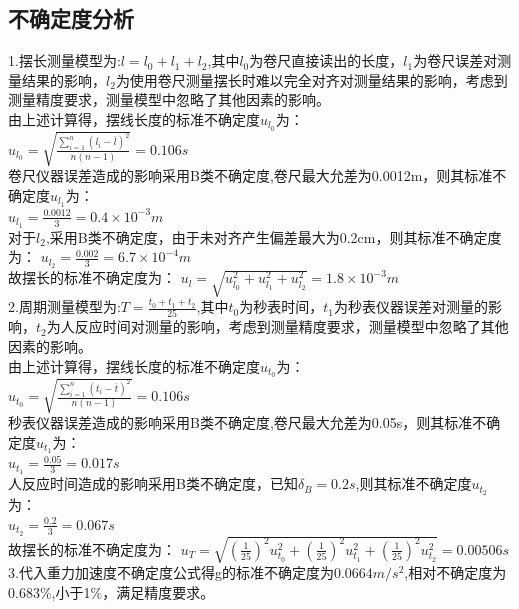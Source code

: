 \documentclass[12pt,a4paper]{article}
\begin{document}
	\subsection{不确定度分析}
	1.摆长测量模型为:$l=l_{0}+l_{1}+l_{2}$,其中$l_{0}$为卷尺直接读出的长度，$l_{1}$为卷尺误差对测量结果的影响，$l_{2}$为使用卷尺测量摆长时难以完全对齐对测量结果的影响，考虑到测量精度要求，测量模型中忽略了其他因素的影响。\\
	由上述计算得，摆线长度的标准不确定度$u_{l_{0}}$为：\\
	$u_{l_{0}}=\sqrt{\frac{\sum_{i=1}^{n} (l_{i}-\overline{l})^2}{n(n-1)}}=0.106s$\\
	卷尺仪器误差造成的影响采用B类不确定度,卷尺最大允差为0.0012m，则其标准不确定度$u_{l_{1}}$为：\\
	$u_{l_{1}}=\frac{0.0012}{3}=0.4\times10^{-3}m$\\
	对于$l_{2}$,采用B类不确定度，由于未对齐产生偏差最大为0.2cm，则其标准不确定度为：
	$u_{l_{2}}=\frac{0.002}{3}=6.7\times10^{-4}m$\\
	故摆长的标准不确定度为：
	$u_{l}=\sqrt{u_{l_{0}}^2+u_{l_{1}}^2+u_{l_{2}}^2}=1.8\times10^{-3}m$\\
	\hspace*{2em}
	2.周期测量模型为:$T=\frac{t_{0}+t_{1}+t_{2}}{25}$,其中$t_{0}$为秒表时间，$t_{1}$为秒表仪器误差对测量的影响，$t_{2}$为人反应时间对测量的影响，考虑到测量精度要求，测量模型中忽略了其他因素的影响。\\
	由上述计算得，摆线长度的标准不确定度$u_{t_{0}}$为：\\
	$u_{t_{0}}=\sqrt{\frac{\sum_{i=1}^{n} (t_{i}-\overline{t})^2}{n(n-1)}}=0.106s$\\
	秒表仪器误差造成的影响采用B类不确定度,卷尺最大允差为0.05s，则其标准不确定度$u_{t_{1}}$为：\\
	$u_{t_{1}}=\frac{0.05}{3}=0.017s$\\
	人反应时间造成的影响采用B类不确定度，已知$\delta_{B}=0.2s$,则其标准不确定度$u_{t_{2}}$为：\\
	$u_{t_{2}}=\frac{0.2}{3}=0.067s$\\
	故摆长的标准不确定度为：
	$u_{T}=\sqrt{(\frac{1}{25})^2u_{t_{0}}^2+(\frac{1}{25})^2u_{t_{1}}^2+(\frac{1}{25})^2u_{t_{2}}^2}=0.00506s$\\
	\hspace*{2em}
	3.代入重力加速度不确定度公式得g的标准不确定度为$0.0664m/s^2$,相对不确定度为$0.683\%$,小于1\%，满足精度要求。
\end{document}

